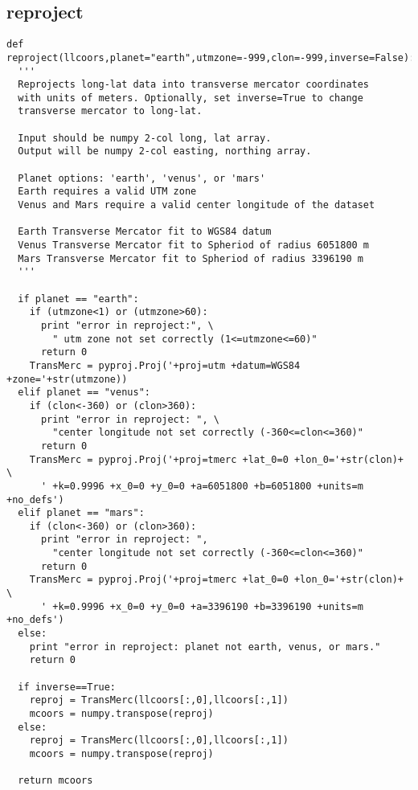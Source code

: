 \subsection{reproject}
\begin{verbatim}
def reproject(llcoors,planet="earth",utmzone=-999,clon=-999,inverse=False):
  '''
  Reprojects long-lat data into transverse mercator coordinates
  with units of meters. Optionally, set inverse=True to change
  transverse mercator to long-lat.
  
  Input should be numpy 2-col long, lat array.
  Output will be numpy 2-col easting, northing array.  
  
  Planet options: 'earth', 'venus', or 'mars'
  Earth requires a valid UTM zone
  Venus and Mars require a valid center longitude of the dataset
  
  Earth Transverse Mercator fit to WGS84 datum
  Venus Transverse Mercator fit to Spheriod of radius 6051800 m
  Mars Transverse Mercator fit to Spheriod of radius 3396190 m
  '''
  
  if planet == "earth":
    if (utmzone<1) or (utmzone>60):
      print "error in reproject:", \
        " utm zone not set correctly (1<=utmzone<=60)"
      return 0
    TransMerc = pyproj.Proj('+proj=utm +datum=WGS84 +zone='+str(utmzone))
  elif planet == "venus":
    if (clon<-360) or (clon>360):
      print "error in reproject: ", \
        "center longitude not set correctly (-360<=clon<=360)"
      return 0
    TransMerc = pyproj.Proj('+proj=tmerc +lat_0=0 +lon_0='+str(clon)+ \ 
      ' +k=0.9996 +x_0=0 +y_0=0 +a=6051800 +b=6051800 +units=m +no_defs')
  elif planet == "mars":
    if (clon<-360) or (clon>360):
      print "error in reproject: ",
        "center longitude not set correctly (-360<=clon<=360)"
      return 0
    TransMerc = pyproj.Proj('+proj=tmerc +lat_0=0 +lon_0='+str(clon)+ \
      ' +k=0.9996 +x_0=0 +y_0=0 +a=3396190 +b=3396190 +units=m +no_defs')
  else:
    print "error in reproject: planet not earth, venus, or mars."
    return 0
  
  if inverse==True:
    reproj = TransMerc(llcoors[:,0],llcoors[:,1])
    mcoors = numpy.transpose(reproj)
  else:
    reproj = TransMerc(llcoors[:,0],llcoors[:,1])
    mcoors = numpy.transpose(reproj)
  
  return mcoors
\end{verbatim}

